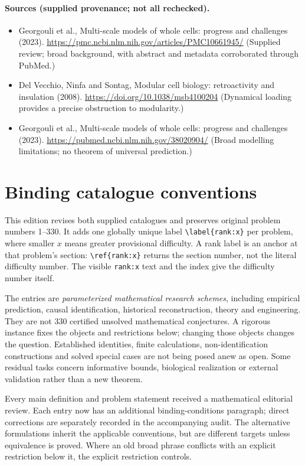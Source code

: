 \documentclass[11pt]{article}
\begin{document}
\paragraph{Sources (supplied provenance; not all rechecked).}
\begin{itemize}
\item Georgouli et al., Multi-scale models of whole cells: progress and challenges (2023). \url{https://pmc.ncbi.nlm.nih.gov/articles/PMC10661945/} (Supplied review; broad background, with abstract and metadata corroborated through PubMed.)
\item Del Vecchio, Ninfa and Sontag, Modular cell biology: retroactivity and insulation (2008). \url{https://doi.org/10.1038/msb4100204} (Dynamical loading provides a precise obstruction to modularity.)
\item Georgouli et al., Multi-scale models of whole cells: progress and challenges (2023). \url{https://pubmed.ncbi.nlm.nih.gov/38020904/} (Broad modelling limitations; no theorem of universal prediction.)
\end{itemize}


\section*{Binding catalogue conventions}
This edition revises both supplied catalogues and preserves original problem numbers 1--330. It adds one globally unique label \verb|\label{rank:x}| per problem, where smaller $x$ means greater provisional difficulty. A rank label is an anchor at that problem's section: \verb|\ref{rank:x}| returns the section number, not the literal difficulty number. The visible \texttt{rank:x} text and the index give the difficulty number itself.

The entries are \emph{parameterized mathematical research schemes}, including empirical prediction, causal identification, historical reconstruction, theory and engineering. They are not 330 certified unsolved mathematical conjectures. A rigorous instance fixes the objects and restrictions below; changing those objects changes the question. Established identities, finite calculations, non-identification constructions and solved special cases are not being posed anew as open. Some residual tasks concern informative bounds, biological realization or external validation rather than a new theorem.

Every main definition and problem statement received a mathematical editorial review. Each entry now has an additional binding-conditions paragraph; direct corrections are separately recorded in the accompanying audit. The alternative formulations inherit the applicable conventions, but are different targets unless equivalence is proved. Where an old broad phrase conflicts with an explicit restriction below it, the explicit restriction controls.
\end{document}
